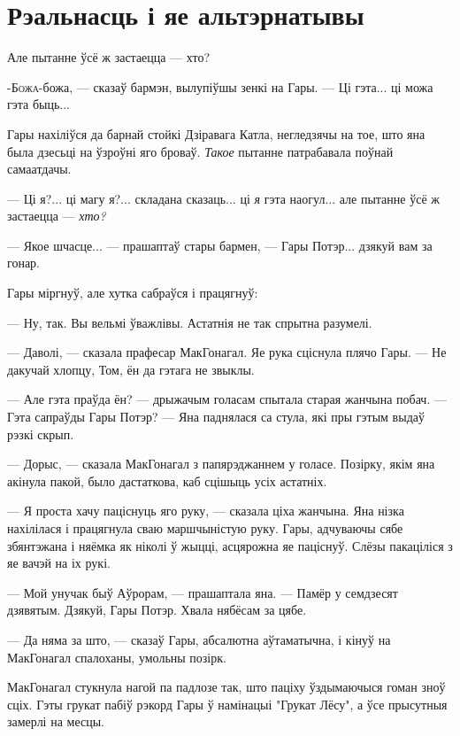 \chapter{Рэальнасць і яе альтэрнатывы}

\begin{chapterOpeningQuote}
Але пытанне ўсё ж застаецца --- хто?
\end{chapterOpeningQuote}

\lettrine{-Б}{ожа}-божа, --- сказаў бармэн, вылупіўшы зенкі на Гары. --- Ці гэта... ці можа
гэта быць...

Гары нахіліўся да барнай стойкі Дзіравага Катла, негледзячы на тое, што яна была дзесьці на 
ўзроўні яго броваў. \emph{Такое} пытанне патрабавала поўнай самаатдачы.

--- Ці я?... ці магу я?... складана сказаць... ці \emph{я} гэта наогул... але пытанне ўсё ж
застаецца --- \emph{хто?}

--- Якое шчасце... --- прашаптаў стары бармен, --- Гары Потэр... дзякуй вам за гонар.

Гары міргнуў, але хутка сабраўся і працягнуў:

--- Ну, так. Вы вельмі ўважлівы. Астатнія не так спрытна разумелі.

--- Даволі, --- сказала прафесар МакГонагал. Яе рука сціснула плячо Гары. --- Не дакучай хлопцу,
Том, ён да гэтага не звыклы.

--- Але гэта праўда ён? --- дрыжачым голасам спытала старая жанчына побач. --- Гэта сапраўды
Гары Потэр? --- Яна паднялася са стула, які пры гэтым выдаў рэзкі скрып.

--- Дорыс, --- сказала МакГонагал з папярэджаннем у голасе. Позірку, якім яна акінула пакой, было
дастаткова, каб сцішыць усіх астатніх.

--- Я проста хачу паціснуць яго руку, --- сказала ціха жанчына. Яна нізка нахілілася і працягнула
сваю маршчыністую руку. Гары, адчуваючы сябе збянтэжана і няёмка як ніколі ў жыцці, асцярожна яе
паціснуў. Слёзы пакаціліся з яе вачэй на іх рукі. 

--- Мой унучак быў Аўрорам, --- прашаптала яна. --- Памёр у семдзесят дзявятым. Дзякуй, Гары Потэр.
Хвала нябёсам за цябе.

--- Да няма за што, --- сказаў Гары, абсалютна аўтаматычна, і кінуў на МакГонагал спалоханы,
умольны позірк.

МакГонагал стукнула нагой па падлозе так, што паціху ўздымаючыся гоман зноў сціх. Гэты грукат 
пабіў рэкорд Гары ў намінацыі "Грукат Лёсу", а ўсе прысутныя замерлі на месцы.

